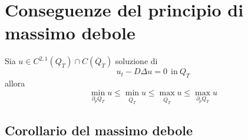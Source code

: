 \documentclass[10pt,a4paper,twoside,openright]{book}
\begin{document}
\section{Conseguenze del principio di massimo debole}

Sia $u\in C^{2,1}(Q_{T}) \cap C(\overline{Q}_{T})$ soluzione di
\begin{equation*}
    u_{t} -D\Delta u=0\ \ \text{in} \ Q_{T}
\end{equation*}
allora
\begin{equation*}
    \min_{\partial _{p} Q_{T}} u\leqslant \min_{\overline{Q}_{T}} u\leqslant \max_{\overline{Q}_{T}} u\leqslant \max_{\partial _{p} Q_{T}} u
\end{equation*}
\subsection{Corollario del massimo debole}
\end{document}
